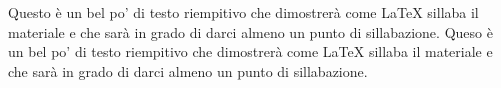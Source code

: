 \documentclass{article}
\begin{document}
Questo è un bel po' di testo riempitivo che dimostrerà come LaTeX sillaba 
il materiale e che sarà in grado di darci almeno un punto di sillabazione.
Queso è un bel po' di testo riempitivo che dimostrerà come LaTeX sillaba
il materiale e che sarà in grado di darci almeno un punto di sillabazione.
\end{document}
